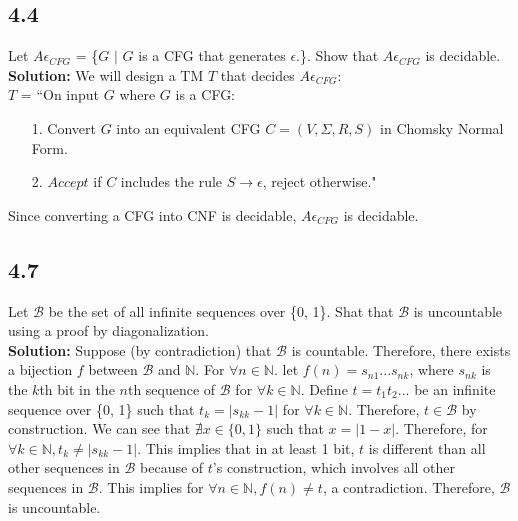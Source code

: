 \subsection*{4.4} Let $A\epsilon_{CFG}$ = \{\textlangle{}$G$\textrangle{} $|$ $G$ is a CFG that generates $\epsilon$.\}. Show that $A\epsilon_{CFG}$ is decidable.
\\
\textbf{Solution:} We will design a TM $T$ that decides $A\epsilon_{CFG}$:
\\
$T$ = ``On input \textlangle{}$G$\textrangle{} where $G$ is a CFG:
\begin{enumerate}
\itemsep0em
\item[1.]Convert $G$ into an equivalent CFG $C = (V, \Sigma, R, S)$ in Chomsky Normal Form.
\item[2.]$Accept$ if $C$ includes the rule $S \rightarrow \epsilon$, reject otherwise."
\end{enumerate}
Since converting a CFG into CNF is decidable, $A\epsilon_{CFG}$ is decidable.

\subsection*{4.7} Let $\mathcal{B}$ be the set of all infinite sequences over \{0, 1\}. Shat that $\mathcal{B}$ is uncountable using a proof by diagonalization.
\\
\textbf{Solution:} Suppose (by contradiction) that $\mathcal{B}$ is countable. Therefore, there exists a bijection $f$ between $\mathcal{B}$ and $\mathbb{N}$. For $\forall n \in \mathbb{N}$. let $f(n) = s_{n1}...s_{nk}$, where $s_{nk}$ is the $k$th bit in the $n$th sequence of $\mathcal{B}$ for $\forall{k} \in \mathbb{N}$. Define $t = t_1t_2...$ be an infinite sequence over \{0, 1\} such that $t_k = |s_{kk}-1|$ for $\forall k \in \mathbb{N}$. Therefore, $t \in \mathcal{B}$ by construction. We can see that $\nexists x \in \{0, 1\}$ such that $x = |1-x|$. Therefore, for $\forall k \in \mathbb{N}, t_k \ne |s_{kk} - 1|$. This implies that in at least 1 bit, $t$ is different than all other sequences in $\mathcal{B}$ because of $t$'s construction, which involves all other sequences in $\mathcal{B}$. This implies for $\forall n \in \mathbb{N}, f(n) \ne t$, a contradiction. Therefore, $\mathcal{B}$ is uncountable.

